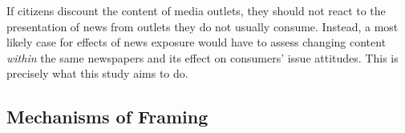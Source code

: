 \documentclass{article}
\begin{document}
If citizens discount the content of media outlets, they should not react to the presentation of news from outlets they do not usually consume. Instead, a most likely case for effects of news exposure would have to assess changing content \textit{within} the same newspapers and its effect on consumers' issue attitudes. This is precisely what this study aims to do.







\subsection{Mechanisms of Framing}
\end{document}
